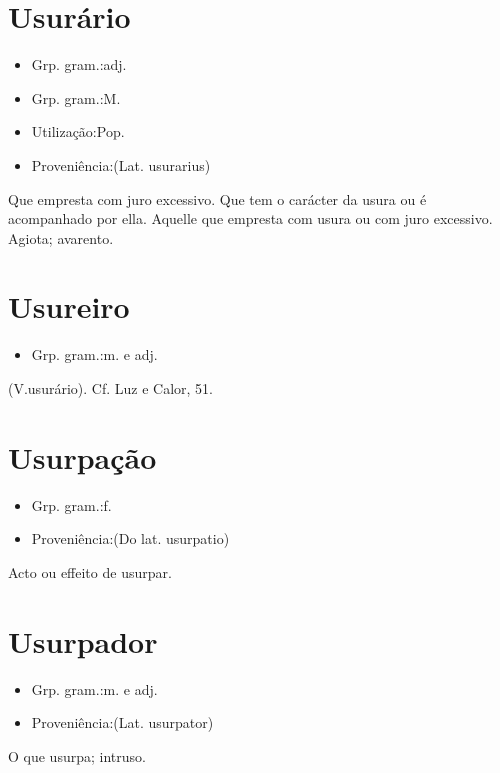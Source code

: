 \documentclass{article}
\begin{document}
\section{Usurário}
\begin{itemize}
\item {Grp. gram.:adj.}
\end{itemize}
\begin{itemize}
\item {Grp. gram.:M.}
\end{itemize}
\begin{itemize}
\item {Utilização:Pop.}
\end{itemize}
\begin{itemize}
\item {Proveniência:(Lat. \textunderscore usurarius\textunderscore )}
\end{itemize}
Que empresta com juro excessivo.
Que tem o carácter da usura ou é acompanhado por ella.
Aquelle que empresta com usura ou com juro excessivo.
Agiota; avarento.
\section{Usureiro}
\begin{itemize}
\item {Grp. gram.:m.  e  adj.}
\end{itemize}
(V.usurário). Cf. \textunderscore Luz e Calor\textunderscore , 51.
\section{Usurpação}
\begin{itemize}
\item {Grp. gram.:f.}
\end{itemize}
\begin{itemize}
\item {Proveniência:(Do lat. \textunderscore usurpatio\textunderscore )}
\end{itemize}
Acto ou effeito de usurpar.
\section{Usurpador}
\begin{itemize}
\item {Grp. gram.:m.  e  adj.}
\end{itemize}
\begin{itemize}
\item {Proveniência:(Lat. \textunderscore usurpator\textunderscore )}
\end{itemize}
O que usurpa; intruso.
\end{document}
